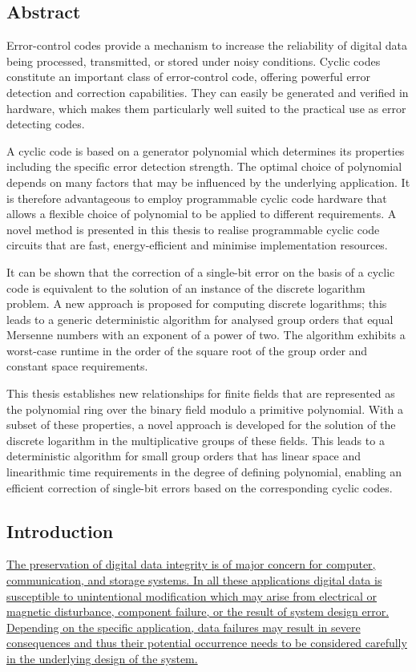 \documentclass[a4paper, 11pt]{article}
\begin{document}
\subsection{Abstract}
Error-control codes provide a mechanism to increase the reliability of digital data being processed, transmitted, or stored under noisy conditions. Cyclic codes constitute an important class of error-control code, offering powerful error detection and correction capabilities. They can easily be generated and verified in hardware, which makes them particularly well suited to the practical use as error detecting codes.

A cyclic code is based on a generator polynomial which determines its properties including the specific error detection strength. The optimal choice of polynomial depends on many factors that may be influenced by the underlying application. It is therefore advantageous to employ programmable cyclic code hardware that allows a flexible choice of polynomial to be applied to different requirements. A novel method is presented in this thesis to realise programmable cyclic code circuits that are fast, energy-efficient and minimise implementation resources.

It can be shown that the correction of a single-bit error on the basis of a cyclic code is equivalent to the solution of an instance of the discrete logarithm problem. A new approach is proposed for computing discrete logarithms; this leads to a generic deterministic algorithm for analysed group orders that equal Mersenne numbers with an exponent of a power of two. The algorithm exhibits a worst-case runtime in the order of the square root of the group order and constant space requirements.

This thesis establishes new relationships for finite fields that are represented as the polynomial ring over the binary field modulo a primitive polynomial. With a subset of these properties, a novel approach is developed for the solution of the discrete logarithm in the multiplicative groups of these fields. This leads to a deterministic algorithm for small group orders that has linear space and linearithmic time requirements in the degree of defining polynomial, enabling an efficient correction of single-bit errors based on the corresponding cyclic codes.

\subsection{Introduction}
\ul{The preservation of digital data integrity is of major concern for computer, communication, and storage systems. In all these applications digital data is susceptible to unintentional modification which may arise from electrical or magnetic disturbance, component failure, or the result of system design error. Depending on the specific application, data failures may result in severe consequences and thus their potential occurrence needs to be considered carefully in the underlying design of the system.}
\end{document}
